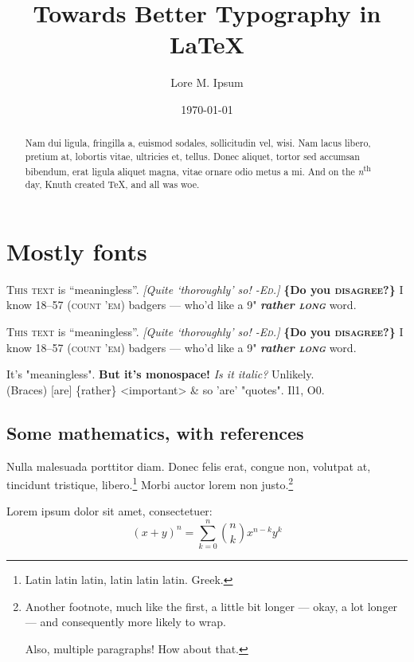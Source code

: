 \documentclass{rntz}
\title{Towards Better Typography in \LaTeX{}}
\author{Lore M. Ipsum}
\date{\today}
\begin{document}
\maketitle

\begin{abstract}
  Nam dui ligula, fringilla a, euismod sodales, sollicitudin vel, wisi. Nam
  lacus libero, pretium at, lobortis vitae, ultricies et, tellus. Donec aliquet,
  tortor sed accumsan bibendum, erat ligula aliquet magna, vitae ornare odio
  metus a mi. And on the \emph{n}\textsuperscript{th} day, Knuth created \TeX,
  and all was woe.
\end{abstract}

\section{Mostly fonts}\label{sec:one}

\newcommand{\testtext}{\textsc{This text} is ``meaningless''. \emph{[Quite
      `thoroughly' so! \textsc{-Ed.}]} {\bfseries \{Do you \textsc{disagree}?\}} I
  know 18--57 (\textsc{count 'em}) badgers --- who'd like a 9"
  {\bfseries\itshape rather \textsc{long}} word.}

\begingroup
\testtext\setlength\parskip{1em}\setlength\parindent{0em}

{\sffamily\testtext}

{\ttfamily It's "meaningless". \textbf{But it's monospace!}
  {\itshape
    Is it italic?} Unlikely.\\
  (Braces) [are] \{rather\} <important> \& so 'are' "quotes".
  Il1, O0.}
\endgroup

\subsection{Some mathematics, with references}

Nulla malesuada porttitor diam. Donec felis erat, congue non, volutpat at,
tincidunt tristique, libero.\footnote{Latin latin latin, latin latin latin.
  Greek.} Morbi auctor lorem non justo.\footnote{Another footnote, much like the
  first, a little bit longer --- okay, a lot longer --- and consequently more
  likely to wrap.\par Also, multiple paragraphs! How about that.}

\begin{theorem}[Binomial]\label{thm:binomial} Lorem ipsum dolor sit amet, consectetuer:
  \[ (x+y)^n = \sum_{k=0}^n \binom{n}{k} x^{n-k} y^k \]
\end{theorem}
\end{document}
